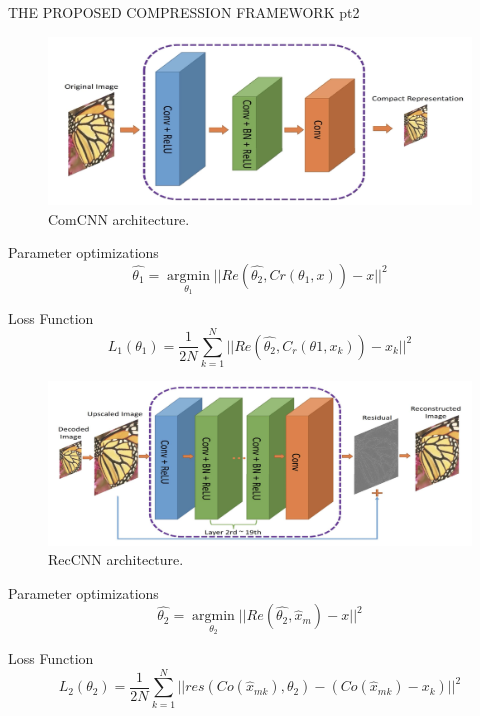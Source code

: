 \documentclass[10pt]{beamer}
\DeclareMathOperator*{\argmin}{argmin}
\begin{document}
\begin{frame}{THE PROPOSED COMPRESSION FRAMEWORK pt2}
    \begin{minipage}{\linewidth}
        \centering
        \begin{minipage}{0.45\linewidth}
            \begin{figure}[H]
                \includegraphics[width = 1 \linewidth]{images/paper3/ComCNN.png}
                \caption{ComCNN architecture.}
            \end{figure}
            \begin{block}{Parameter optimizations}
                \small $$ \hat{\theta_1} = \argmin\limits_{\theta_1}||Re(\hat{\theta_2},Cr(\theta_1,x))-x||^2 $$
            \end{block}
            \begin{block}{Loss Function}
               \tiny $$ L_1(\theta_1) = \frac{1}{2N}\sum_{k=1}^N||Re(\hat{\theta_2}, C_r(\theta1,x_k))-x_k||^2 $$
            \end{block}
        \end{minipage}
        \hspace{0.05\linewidth}
        \begin{minipage}{0.45\linewidth}
            \begin{figure}[htbp]
                \centering
                \includegraphics[width = 1 \linewidth]{images/paper3/RecCNN.png}
                \centering
                \caption{RecCNN architecture.}
            \end{figure}
            \begin{block}{Parameter optimizations}
                \small $$ \hat{\theta_2} = \argmin\limits_{\theta_2}||Re(\hat{\theta_2},\hat{x}_m)-x||^2 $$
            \end{block}
            \begin{block}{Loss Function}
                \tiny $$ L_2(\theta_2) = \frac{1}{2N}\sum_{k=1}^N||res(Co(\hat{x}_{mk}), \theta_2) - (Co(\hat{x}_{mk})-x_k)||^2 $$
             \end{block}
        \end{minipage}
    \end{minipage}
\end{frame}
\end{document}
